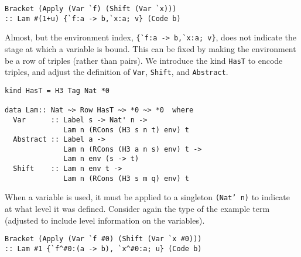 \documentclass{sigplanconf}
\begin{document}
\begin{verbatim}
Bracket (Apply (Var `f) (Shift (Var `x))) 
:: Lam #(1+u) {`f:a -> b,`x:a; v} (Code b)
\end{verbatim}
Almost, but the environment index, \verb+{`f:a -> b,`x:a; v}+,
does not indicate the stage at which a variable is bound. This can be
fixed by making the environment be a row of triples (rather than pairs).
We introduce the kind {\tt HasT} to encode triples, and adjust the definition of {\tt Var},
{\tt Shift}, and {\tt Abstract}. 
\begin{verbatim}
kind HasT = H3 Tag Nat *0

data Lam:: Nat ~> Row HasT ~> *0 ~> *0  where
  Var      :: Label s -> Nat' n -> 
              Lam n (RCons (H3 s n t) env) t
  Abstract :: Label a -> 
              Lam n (RCons (H3 a n s) env) t -> 
              Lam n env (s -> t)
  Shift    :: Lam n env t -> 
              Lam n (RCons (H3 s m q) env) t
\end{verbatim}
When a variable is used, it must be applied to a singleton {\tt (Nat' n)}
to indicate at what level it was defined. Consider again the type of
the example term (adjusted to include level information on the variables).
\begin{verbatim}
Bracket (Apply (Var `f #0) (Shift (Var `x #0)))
:: Lam #1 {`f^#0:(a -> b), `x^#0:a; u} (Code b)
\end{verbatim}
\end{document}
